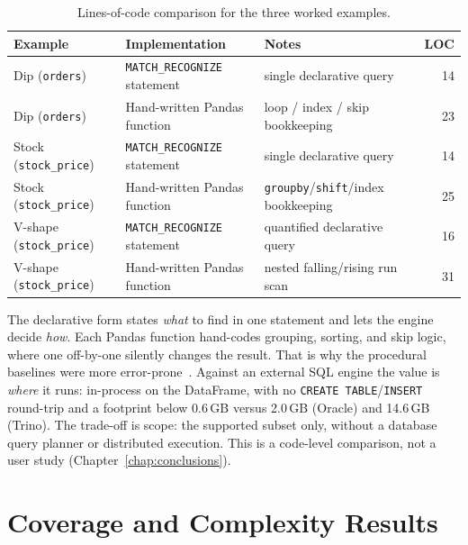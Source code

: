 \begin{table}[H]
\centering
\caption{Lines-of-code comparison for the three worked examples.}
\label{tab:loc_comparison}
{\small
\setlength{\tabcolsep}{4pt}
\begin{tabularx}{\textwidth}{l l >{\raggedright\arraybackslash}X r}
\toprule
\textbf{Example} & \textbf{Implementation} & \textbf{Notes} & \textbf{LOC} \\
\midrule
Dip (\texttt{orders}) & \texttt{MATCH\_RECOGNIZE} statement & single declarative query & 14 \\
Dip (\texttt{orders}) & Hand-written Pandas function & loop / index / skip bookkeeping & 23 \\
\midrule
Stock (\texttt{stock\_price}) & \texttt{MATCH\_RECOGNIZE} statement & single declarative query & 14 \\
Stock (\texttt{stock\_price}) & Hand-written Pandas function & \texttt{groupby}/\texttt{shift}/index bookkeeping & 25 \\
\midrule
V-shape (\texttt{stock\_price}) & \texttt{MATCH\_RECOGNIZE} statement & quantified declarative query & 16 \\
V-shape (\texttt{stock\_price}) & Hand-written Pandas function & nested falling/rising run scan & 31 \\
\bottomrule
\end{tabularx}
}
\end{table}

The declarative form states \emph{what} to find in one statement and
lets the engine decide \emph{how}.  Each Pandas function hand-codes grouping,
sorting, and skip logic, where one off-by-one silently changes the
result.  That is why the procedural baselines were more
error-prone~\cite{Python_UDF}.  Against an external SQL engine the
value is \emph{where} it runs: in-process on the DataFrame, with no
\texttt{CREATE TABLE}/\texttt{INSERT} round-trip and a footprint below
0.6\,GB versus 2.0\,GB (Oracle) and 14.6\,GB (Trino).  The trade-off is
scope: the supported subset only, without a database query planner or
distributed execution.  This is a code-level comparison, not a user study
(Chapter~\ref{chap:conclusions}).

\section{Coverage and Complexity Results}
\label{sec:eval-coverage}


